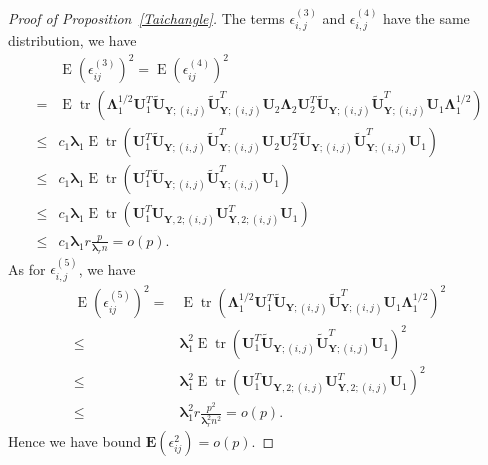 \documentclass[12pt]{article} %
\DeclareMathOperator{\mytr}{tr}
\DeclareMathOperator{\myE}{E}
\newcommand{\bE}{\mathbf{E}}
\newcommand{\bY}{\mathbf{Y}}
\newcommand{\bU}{\mathbf{U}}
\newcommand{\bfsym}[1]{\ensuremath{\boldsymbol{#1}}}
\def\blambda {\bfsym {\lambda}}
\def\bLambda {\bfsym {\Lambda}}
\theoremstyle{definition}
\begin{document}
\begin{appendices}
\begin{proof}[Proof of Proposition~\ref{Taichangle}]
        The terms $\epsilon_{i,j}^{(3)}$ and $\epsilon_{i,j}^{(4)}$ have the same distribution, we have
        $$
        \begin{aligned}
            &\myE(\epsilon_{ij}^{(3)})^2 =
            \myE(\epsilon_{ij}^{(4)})^2 \\
            =&\myE \mytr ( \bLambda_1^{1/2}\bU_1^T\tilde{\bU}_{\bY;(i,j)}\tilde{\bU}_{\bY;(i,j)}^T \bU_2 \bLambda_2 \bU_2^T \tilde{\bU}_{\bY;(i,j)}\tilde{\bU}_{\bY;(i,j)}^T \bU_1 \bLambda_1^{1/2})\\
            \leq& c_1 \blambda_1  \myE \mytr ( \bU_1^T\tilde{\bU}_{\bY;(i,j)}\tilde{\bU}_{\bY;(i,j)}^T \bU_2 \bU_2^T \tilde{\bU}_{\bY;(i,j)}\tilde{\bU}_{\bY;(i,j)}^T \bU_1 )\\
            \leq& c_1 \blambda_1  \myE \mytr ( \bU_1^T\tilde{\bU}_{\bY;(i,j)}\tilde{\bU}_{\bY;(i,j)}^T \bU_1 )\\
            \leq& c_1 \blambda_1  \myE \mytr ( \bU_1^T{\bU}_{\bY,2;(i,j)}{\bU}_{\bY,2;(i,j)}^T \bU_1 )\\
            \leq& c_1 \blambda_1 r \frac{p}{\blambda_r n}=o(p).
        \end{aligned}
        $$
        As for $\epsilon_{i,j}^{(5)}$, we have
        $$
        \begin{aligned}
            \myE(\epsilon_{ij}^{(5)})^2 
            =&\myE \mytr (\bLambda_1^{1/2}\bU_1^T
            \tilde{\bU}_{\bY;(i,j)} \tilde{\bU}_{\bY;(i,j)}^T\bU_1 \bLambda_1^{1/2})^2\\
            \leq & \blambda_1^2\myE \mytr (\bU_1^T
            \tilde{\bU}_{\bY;(i,j)} \tilde{\bU}_{\bY;(i,j)}^T\bU_1 )^2\\
            \leq&  \blambda_1^2  \myE \mytr ( \bU_1^T{\bU}_{\bY,2;(i,j)}{\bU}_{\bY,2;(i,j)}^T \bU_1 )^2\\
            \leq& \blambda_1^2 r \frac{p^2}{\blambda_r^2 n^2}=o(p).
        \end{aligned}
        $$
Hence we have bound $\bE (\epsilon_{ij}^2)=o(p)$.


\end{proof}
\end{appendices}
\end{document}
